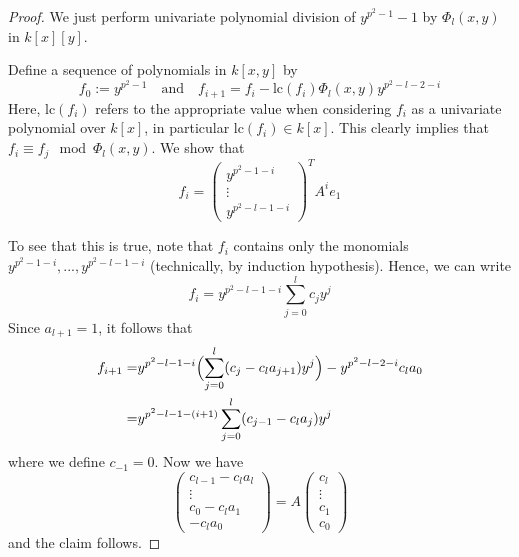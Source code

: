 \begin{proof}
    We just perform univariate polynomial division of $y^{p^2 - 1} - 1$ by $\Phi_l(x, y)$ in $k[x][y]$.

    Define a sequence of polynomials in $k[x, y]$ by
    \begin{equation*}
        f_0 := y^{p^2 - 1} \quad \text{and} \quad f_{i + 1} = f_i - \mathrm{lc}(f_i) \Phi_l(x, y) y^{p^2 - l - 2 - i}
    \end{equation*}
    Here, $\mathrm{lc}(f_i)$ refers to the appropriate value when considering $f_i$ as a univariate polynomial over $k[x]$, in particular $\mathrm{lc}(f_i) \in k[x]$.
    This clearly implies that $f_i \equiv f_j \mod \Phi_l(x, y)$.
    We show that
    \begin{equation*}
        f_i = \left( \begin{matrix*}
            y^{p^2 - 1 - i} \\ \vdots \\ y^{p^2 - l - 1 - i}
        \end{matrix*} \right)^T A^i e_1
    \end{equation*}

    To see that this is true, note that $f_i$ contains only the monomials $y^{p^2 - 1 - i}, ..., y^{p^2 - l - 1 - i}$ (technically, by induction hypothesis).
    Hence, we can write
    \begin{equation*}
        f_i = y^{p^2 - l - 1 - i} \sum_{j = 0}^l c_j y^j
    \end{equation*}
    Since $a_{l + 1} = 1$, it follows that
    \begin{align*}
        f_{i + 1} =& y^{p^2 - l - 1 - i} \Bigl( \sum_{j = 0}^l (c_j - c_l a_{j + 1}) y^j \Bigr) - y^{p^2 - l - 2 - i} c_l a_0 \\
        =& y^{p^2 - l - 1 - (i + 1)} \sum_{j = 0}^l (c_{j - 1} - c_l a_j) y^j
    \end{align*}
    where we define $c_{-1} = 0$.
    Now we have
    \begin{equation*}
        \left( \begin{matrix*}
            c_{l - 1} - c_l a_l \\
            \vdots \\
            c_0 - c_l a_1 \\
           - c_l a_0
        \end{matrix*} \right) = A \left( \begin{matrix*}
            c_l \\
            \vdots \\
            c_1 \\
            c_0
        \end{matrix*} \right)
    \end{equation*}
    and the claim follows.
\end{proof}
